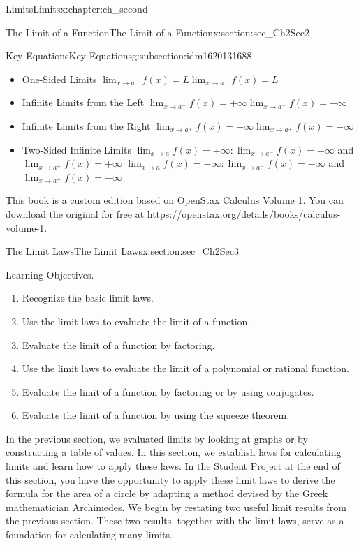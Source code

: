 \documentclass[oneside,10pt,]{book}
\numberwithin{equation}{section}
\begin{document}
\begin{chapterptx}{Limits}{}{Limits}{}{}{x:chapter:ch_second}
\begin{sectionptx}{The Limit of a Function}{}{The Limit of a Function}{}{}{x:section:sec_Ch2Sec2}
\begin{subsectionptx}{Key Equations}{}{Key Equations}{}{}{g:subsection:idm1620131688}
\begin{itemize}[label=\textbullet]
\item{}One-Sided Limits \(\lim_{x\to a^{-} }f(x)=L \lim_{x\to a^{+}}f(x)=L\)%
\item{}Infinite Limits from the Left \(\lim_{x\to a^{-} }f(x)=+\infty \lim_{x\to a^{-} }f(x)=-\infty\)%
\item{}Infinite Limits from the Right \(\lim_{x\to a^{+}}f(x)=+\infty \lim_{x\to a^{+}}f(x)=-\infty\)%
\item{}Two-Sided Infinite Limits \(\lim_{x \to a} f(x)=+\infty:\lim_{x\to a^{-} }f(x)=+\infty\) and \(\lim_{x\to a^{+}}f(x)=+\infty\) \(\lim_{x \to a} f(x)=-\infty:\lim_{x\to a^{-} }f(x)=-\infty\) and \(\lim_{x\to a^{+}}f(x)=-\infty\)%
\end{itemize}
\end{subsectionptx}
This book is a custom edition based on OpenStax Calculus Volume 1. You can download the original for free at https:\slash{}\slash{}openstax.org\slash{}details\slash{}books\slash{}calculus-volume-1.%
\end{sectionptx}
%
%
\typeout{************************************************}
\typeout{************************************************}
%
\begin{sectionptx}{The Limit Laws}{}{The Limit Laws}{}{}{x:section:sec_Ch2Sec3}
\begin{introduction}{Learning Objectives.}%
%
\begin{enumerate}
\item{}Recognize the basic limit laws.%
\item{}Use the limit laws to evaluate the limit of a function.%
\item{}Evaluate the limit of a function by factoring.%
\item{}Use the limit laws to evaluate the limit of a polynomial or rational function.%
\item{}Evaluate the limit of a function by factoring or by using conjugates.%
\item{}Evaluate the limit of a function by using the squeeze theorem.%
\end{enumerate}
In the previous section, we evaluated limits by looking at graphs or by constructing a table of values. In this section, we establish laws for calculating limits and learn how to apply these laws. In the Student Project at the end of this section, you have the opportunity to apply these limit laws to derive the formula for the area of a circle by adapting a method devised by the Greek mathematician Archimedes. We begin by restating two useful limit results from the previous section. These two results, together with the limit laws, serve as a foundation for calculating many limits.%

\end{introduction}
\end{sectionptx}
\end{chapterptx}
\end{document}

